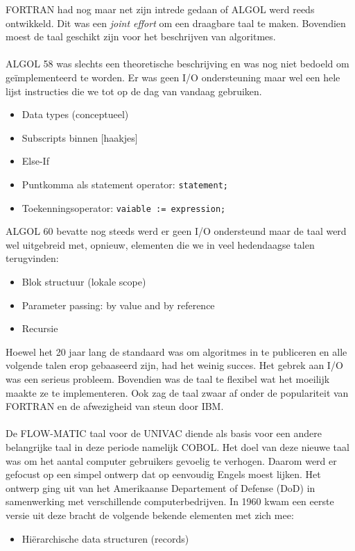 \documentclass[../main.tex]{subfiles}
\begin{document}
\begin{solution}
FORTRAN had nog maar net zijn intrede gedaan of ALGOL werd reeds ontwikkeld.
Dit was een \emph{joint effort} om een draagbare taal te maken. Bovendien moest de taal geschikt zijn voor het beschrijven van algoritmes.
\\\\
ALGOL 58 was slechts een theoretische beschrijving en was nog niet bedoeld om ge\"implementeerd te worden.
Er was geen I/O ondersteuning maar wel een hele lijst instructies die we tot op de dag van vandaag gebruiken.
\begin{itemize}
		\item Data types (conceptueel)
		\item Subscripts binnen [haakjes]
		\item Else-If
		\item Puntkomma als statement operator: \texttt{statement;}
		\item Toekenningsoperator: \texttt{vaiable := expression;}
\end{itemize}
ALGOL 60 bevatte nog steeds werd er geen I/O ondersteund maar de taal werd wel uitgebreid met, opnieuw, elementen die we in veel hedendaagse talen terugvinden:
\begin{itemize}
		\item Blok structuur (lokale scope)
		\item Parameter passing: by value and by reference
		\item Recursie
\end{itemize}
Hoewel het  20 jaar lang de standaard was om algoritmes in te publiceren en alle volgende talen erop gebaaseerd zijn, had het weinig succes. Het gebrek aan I/O was een serieus probleem. Bovendien was de taal te flexibel wat het moeilijk maakte ze te implementeren. Ook zag de taal zwaar af onder de populariteit van FORTRAN en de afwezigheid van steun door IBM.
\\\\
De FLOW-MATIC taal voor de UNIVAC diende als basis voor een andere belangrijke taal in deze periode namelijk COBOL.
Het doel van deze nieuwe taal was om het aantal computer gebruikers gevoelig te verhogen.
Daarom werd er gefocust op een simpel ontwerp dat op eenvoudig Engels moest lijken.
Het ontwerp ging uit van het Amerikaanse Departement of Defense (DoD) in samenwerking met verschillende computerbedrijven.
In 1960 kwam een eerste versie uit deze bracht de volgende bekende elementen met zich mee:
\begin{itemize}
		\item Hi\"erarchische data structuren (records)

\end{itemize}
\end{solution}
\end{document}
